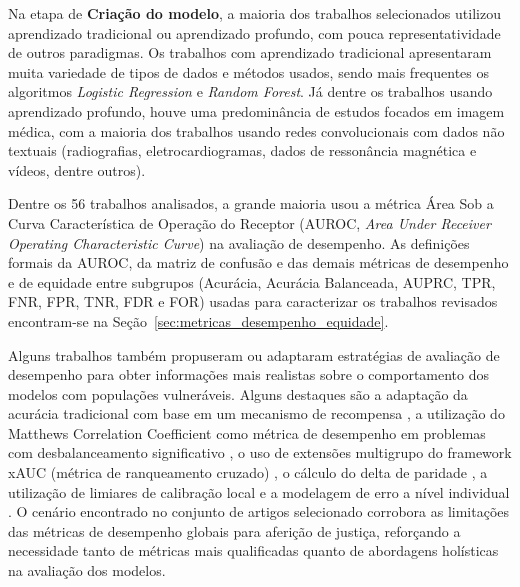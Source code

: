 Na etapa de \textbf{Criação do modelo}, a maioria dos trabalhos selecionados utilizou aprendizado tradicional ou aprendizado profundo, com pouca representatividade de outros paradigmas. Os trabalhos com aprendizado tradicional apresentaram muita variedade de tipos de dados e métodos usados, sendo mais frequentes os algoritmos \emph{Logistic Regression} e \emph{Random Forest}. Já dentre os trabalhos usando aprendizado profundo, houve uma predominância de estudos focados em imagem médica, com a maioria dos trabalhos usando redes convolucionais com dados não textuais (radiografias, eletrocardiogramas, dados de ressonância magnética e vídeos, dentre outros).

Dentre os 56 trabalhos analisados, a grande maioria usou a métrica Área Sob a Curva Característica de Operação do Receptor (AUROC, \emph{Area Under Receiver Operating Characteristic Curve}) na avaliação de desempenho.
As definições formais da AUROC, da matriz de confusão e das demais métricas de desempenho e de equidade entre subgrupos (Acurácia, Acurácia Balanceada, AUPRC, TPR, FNR, FPR, TNR, FDR e FOR) usadas para caracterizar os trabalhos revisados encontram-se na Seção~\ref{sec:metricas_desempenho_equidade}.

Alguns trabalhos também propuseram ou adaptaram estratégias de avaliação de desempenho para obter informações mais realistas sobre o comportamento dos modelos com populações vulneráveis. Alguns destaques são a adaptação da acurácia tradicional com base em um mecanismo de recompensa \cite{alday2022age}, a utilização do Matthews Correlation Coefficient como métrica de desempenho em problemas com desbalanceamento significativo \cite{afrose2022subpopulation}, o uso de extensões multigrupo do framework xAUC (métrica de ranqueamento cruzado) \cite{pfohl2021empirical}, o cálculo do delta de paridade \cite{burlina2021addressing}, a utilização de limiares de calibração local \cite{foryciarz2022evaluating} e a modelagem de erro a nível individual \cite{estiri2022objective}. O cenário encontrado no conjunto de artigos selecionado corrobora as limitações das métricas de desempenho globais para aferição de justiça, reforçando a necessidade tanto de métricas mais qualificadas quanto de abordagens holísticas na avaliação dos modelos.

